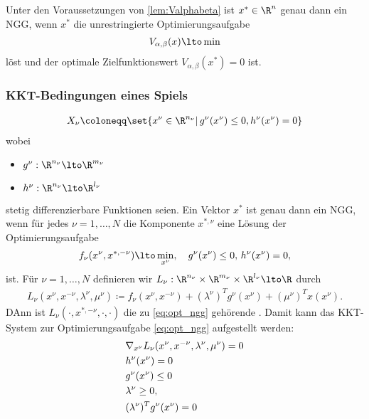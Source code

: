 \begin{korollar} %
  Unter den Voraussetzungen von \ref{lem:Valphabeta} ist $x^{*} \in \R^{n}$ genau dann ein NGG, wenn $x^{*}$ die unrestringierte Optimierungsaufgabe
  \begin{align}\label{eq:opt_vab}
    V_{\alpha, \beta}(x) \lto \min
  \end{align}
löst und der optimale Zielfunktionswert $V_{\alpha, \beta}(x^{*}) = 0$ ist. 
\end{korollar}

\subsubsection{KKT-Bedingungen eines Spiels}
\label{sec:kkt-beding-eines}
\begin{align}\label{eq:X_nu_kkt}
  X_{\nu} \coloneqq \set{x^{\nu}\in \R^{n_{\nu}}| \, g^{\nu}(x^{\nu}) \leq 0, h^{\nu} (x^{\nu}) = 0}
\end{align}
wobei
\begin{itemize}
\item $g^{\nu}: \R^{n_{\nu}} \lto \R^{m_{\nu}}$
\item $h^{\nu}: \R^{n_{\nu}} \lto \R^{l_{\nu}}$
\end{itemize}
stetig differenzierbare Funktionen seien. Ein Vektor $x^{*}$ ist genau dann ein NGG, wenn für jedes $\nu = 1, \dots, N$ die Komponente $x^{*, \nu}$ eine Lösung der Optimierungsaufgabe
\begin{align}\label{eq:opt_ngg} %
  f_{\nu}(x^{\nu}, x^{*, -\nu}) \lto \min_{x^{\nu}}, \quad g^{\nu} (x^{\nu}) \leq 0, \, h^{\nu} (x^{\nu}) = 0,
\end{align}
ist. Für $\nu = 1, \dots, N$ definieren wir $L_{\nu}: \R^{n_{\nu}} \times \R^{m_{\nu}} \times \R^{l_{\nu}} \lto \R$ durch
\begin{align*}
  L_{\nu}(x^{\nu}, x^{-\nu}, \lambda^{\nu}, \mu^{\nu}) \coloneqq f_{\nu}(x^{\nu}, x^{-\nu}) + (\lambda^{\nu})^{T}g^{\nu}(x^{\nu}) + (\mu^{\nu})^{T}x(x^{\nu}). 
\end{align*}
DAnn ist $L_{\nu}(\cdot, x^{*, -\nu}, \cdot, \cdot)$ die zu \eqref{eq:opt_ngg} gehörende . Damit kann das KKT-System zur Optimierungsaufgabe \eqref{eq:opt_ngg} aufgestellt werden:
\begin{align}\label{eq:kkt_*} %
&  \nabla_{x^{\nu}}L_{\nu}(x^{\nu}, x^{-\nu}, \lambda^{\nu}, \mu^{\nu}) = 0\\
&h^{\nu}(x^{\nu}) = 0\notag\\
&g^{\nu}(x^{\nu}) \leq 0\notag\\
&\lambda^{\nu} \geq 0,\notag\\
&(\lambda^{\nu})^{T}g^{\nu}(x^{\nu})= 0 \notag
\end{align}
